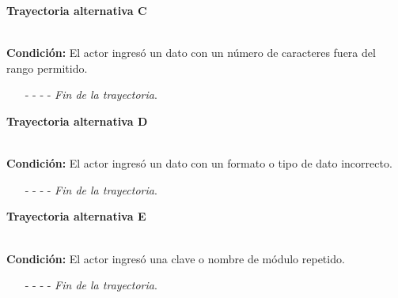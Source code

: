 \hypertarget{CU5-1:TAC}{\textbf{Trayectoria alternativa C}}\\
\noindent \textbf{Condición:} El actor ingresó un dato con un número de caracteres fuera del rango permitido.
\begin{enumerate}
	\UCpaso[\UCsist] Muestra el mensaje  señalando el campo que presenta el error en la pantalla .
	\UCpaso Regresa al paso \ref{CU5.1-P3} de la trayectoria principal.
	\item[- -] - - {\em {Fin de la trayectoria}}.%
\end{enumerate}
\hypertarget{CU5-1:TAD}{\textbf{Trayectoria alternativa D}}\\
\noindent \textbf{Condición:} El actor ingresó un dato con un formato o tipo de dato incorrecto.
\begin{enumerate}
	\UCpaso[\UCsist] Muestra el mensaje  señalando el campo que presenta el error en la pantalla .
	\UCpaso Regresa al paso \ref{CU5.1-P3} de la trayectoria principal.
	\item[- -] - - {\em {Fin de la trayectoria}}.
\end{enumerate}
\hypertarget{CU5-1:TAE}{\textbf{Trayectoria alternativa E}}\\
\noindent \textbf{Condición:} El actor ingresó una clave o nombre de módulo repetido.
\begin{enumerate}
	\UCpaso[\UCsist] Muestra el mensaje  señalando el campo que presenta la duplicidad en la pantalla 
	\UCpaso Regresa al paso \ref{CU5.1-P3} de la trayectoria principal.
	\item[- -] - - {\em {Fin de la trayectoria}}.
\end{enumerate}
	

